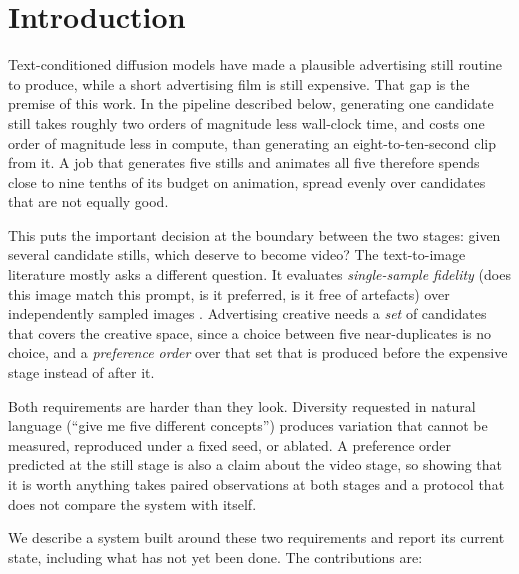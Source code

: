 \documentclass[conference]{IEEEtran}
\begin{document}
\section{Introduction}

Text-conditioned diffusion models have made a plausible advertising still routine to
produce, while a short advertising film is still expensive. That gap is the premise
of this work. In the pipeline described below, generating one candidate still takes
roughly two orders of magnitude less wall-clock time, and costs one order of
magnitude less in compute, than generating an eight-to-ten-second clip from it. A
job that generates five stills and animates all five therefore spends close to nine
tenths of its budget on animation, spread evenly over candidates that are not
equally good.

This puts the important decision at the boundary between the two stages: given
several candidate stills, which deserve to become video? The text-to-image
literature mostly asks a different question. It evaluates \emph{single-sample
fidelity} (does this image match this prompt, is it preferred, is it free of
artefacts) over independently sampled images
\cite{ho2020ddpm,rombach2022ldm,podell2023sdxl}. Advertising creative needs a
\emph{set} of candidates that covers the creative space, since a choice
between five near-duplicates is no choice, and a \emph{preference order} over that
set that is produced before the expensive stage instead of after it.

Both requirements are harder than they look. Diversity requested in natural language
(``give me five different concepts'') produces variation that cannot be measured,
reproduced under a fixed seed, or ablated. A preference order predicted at the still
stage is also a claim about the video stage, so showing that it is worth anything
takes paired observations at both stages and a protocol that does not compare the
system with itself.

We describe a system built around these two requirements and report its current
state, including what has not yet been done. The contributions are:
\end{document}
